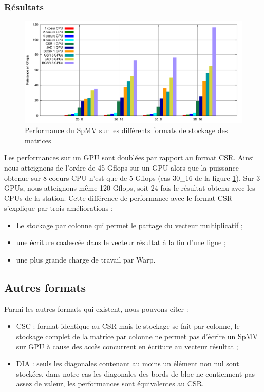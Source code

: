 \documentclass[renpar]{compas2013}
\begin{document}
    \subsubsection{Résultats}
    \begin{figure}\begin{center}
        \includegraphics[width=1.05\textwidth]{images/SPMV.pdf}
        \caption{Performance du SpMV sur les différents formats de stockage des matrices}
        \label{spmv_result}
    \end{center}\end{figure}
   
    Les performances sur un GPU sont doublées par rapport au format CSR.
    Ainsi nous atteignons de l'ordre de 45 Gflops sur un GPU alors que la 
    puissance obtenue sur 8 coeurs CPU n'est que de 5 Gflops (cas 30\_16 de la figure \ref{spmv_result}).
    Sur 3 GPUs, nous atteignons même 120 Gflops, soit 24 fois le résultat obtenu avec les
    CPUs de la station.
    Cette différence de performance avec le format CSR s'explique par trois améliorations :
    \begin{itemize}
      \item Le stockage par colonne qui permet le partage du vecteur multiplicatif ;
      \item une écriture coalescée dans le vecteur résultat à la fin d'une ligne ;
      \item une plus grande charge de travail par Warp.
    \end{itemize}

  \subsection{Autres formats}
   Parmi les autres formats qui existent, nous pouvons citer :
   \begin{itemize}
     \item CSC : format identique au CSR mais le stockage se fait par colonne,
       le stockage complet de la matrice par colonne ne permet pas d'écrire un SpMV sur GPU à
       cause des accès concurrent en écriture au vecteur résultat ;
     \item DIA : seuls les diagonales contenant au moins un élément non nul sont stockées, dans notre
       cas les diagonales des bords de bloc ne contiennent pas assez de valeur, les performances sont
       équivalentes au CSR.
   \end{itemize}
\end{document}
